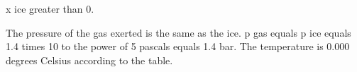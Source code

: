 x ice greater than 0.  

The pressure of the gas exerted is the same as the ice.  
p gas equals p ice equals 1.4 times 10 to the power of 5 pascals equals 1.4 bar.  
The temperature is 0.000 degrees Celsius according to the table.